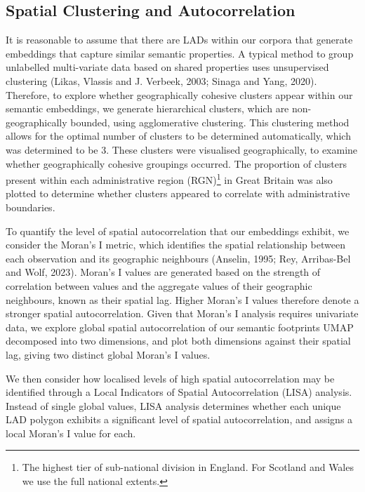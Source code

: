 \documentclass[
]{article}
\begin{document}
\subsection{Spatial Clustering and
Autocorrelation}\label{spatial-clustering-and-autocorrelation}

It is reasonable to assume that there are LADs within our corpora that
generate embeddings that capture similar semantic properties. A typical
method to group unlabelled multi-variate data based on shared properties
uses unsupervised clustering (Likas, Vlassis and J. Verbeek, 2003;
Sinaga and Yang, 2020). Therefore, to explore whether geographically
cohesive clusters appear within our semantic embeddings, we generate
hierarchical clusters, which are non-geographically bounded, using
agglomerative clustering. This clustering method allows for the optimal
number of clusters to be determined automatically, which was determined
to be 3. These clusters were visualised geographically, to examine
whether geographically cohesive groupings occurred. The proportion of
clusters present within each administrative region (RGN)\footnote{The
  highest tier of sub-national division in England. For Scotland and
  Wales we use the full national extents.} in Great Britain was also
plotted to determine whether clusters appeared to correlate with
administrative boundaries.

To quantify the level of spatial autocorrelation that our embeddings
exhibit, we consider the Moran's I metric, which identifies the spatial
relationship between each observation and its geographic neighbours
(Anselin, 1995; Rey, Arribas-Bel and Wolf, 2023). Moran's I values are
generated based on the strength of correlation between values and the
aggregate values of their geographic neighbours, known as their spatial
lag. Higher Moran's I values therefore denote a stronger spatial
autocorrelation. Given that Moran's I analysis requires univariate data,
we explore global spatial autocorrelation of our semantic footprints
UMAP decomposed into two dimensions, and plot both dimensions against
their spatial lag, giving two distinct global Moran's I values.

We then consider how localised levels of high spatial autocorrelation
may be identified through a Local Indicators of Spatial Autocorrelation
(LISA) analysis. Instead of single global values, LISA analysis
determines whether each unique LAD polygon exhibits a significant level
of spatial autocorrelation, and assigns a local Moran's I value for
each.
\end{document}
